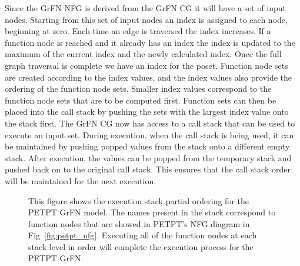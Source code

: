 Since the GrFN NFG is derived from the GrFN CG it will have a set of input nodes.
Starting from this set of input nodes an index is assigned to each node, beginning at zero.
Each time an edge is traversed the index increases.
If a function node is reached and it already has an index the index is updated to the maximum of the current index and the newly calculated index.
Once the full graph traversal is complete we have an index for the poset.
Function node sets are created according to the index values, and the index values also provide the ordering of the function node sets.
Smaller index values correspond to the function node sets that are to be computed first.
Function sets can then be placed into the call stack by pushing the sets with the largest index value onto the stack first.
The GrFN CG now has access to a call stack that can be used to execute an input set.
During execution, when the call stack is being used, it can be maintained by pushing popped values from the stack onto a different empty stack.
After execution, the values can be popped from the temporary stack and pushed back on to the original call stack.
This ensures that the call stack order will be maintained for the next execution.

\begin{figure}[!htbp]
  \label{fig:petpt_execution_stack}
  \centering
  \caption[PETPT GrFN Execution Stack]{This figure shows the execution stack partial ordering for the PETPT GrFN model. The names present in the stack correspond to function nodes that are showed in PETPT's NFG diagram in Fig~\ref{fig:petpt_nfg}. Executing all of the function nodes at each stack level in order will complete the execution process for the PETPT GrFN.}
\end{figure}

